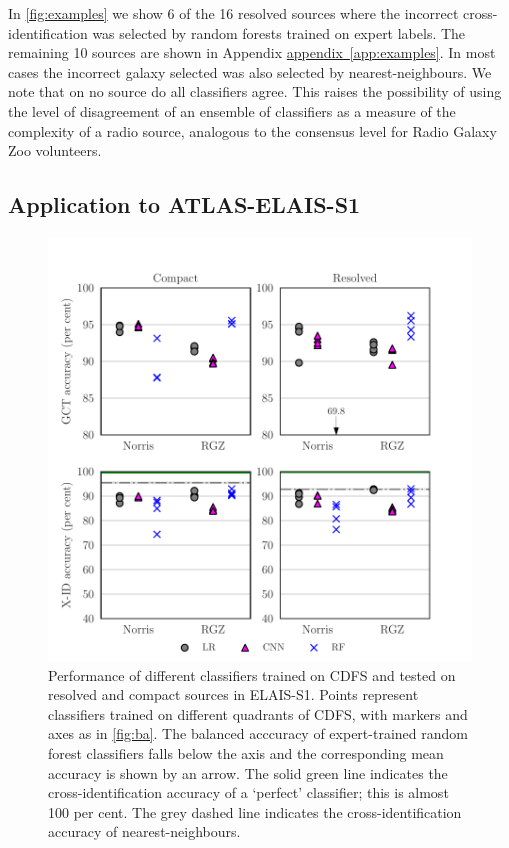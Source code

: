 \documentclass[fleqn,usenatbib,usedcolumn]{mnras}
\newcommand{\aref}[1]{\hyperref[#1]{appendix~\ref{#1}}}
\begin{document}
    In \autoref{fig:examples} we show 6 of the 16 resolved sources where the incorrect cross-identification was selected by random forests trained on expert labels. The remaining 10 sources are shown in Appendix \aref{app:examples}. In most cases the incorrect galaxy selected was also selected by nearest-neighbours. We note that on no source do all classifiers agree. This raises the possibility of using the level of disagreement of an ensemble of classifiers as a measure of the complexity of a radio source, analogous to the consensus level for Radio Galaxy Zoo volunteers.

\subsection{Application to ATLAS-ELAIS-S1}
  \label{sec:elais}

  \begin{figure}
  \centering
  \includegraphics[width=\columnwidth]{images/elais-grid-new.pdf}
  \caption{Performance of different classifiers trained on CDFS and tested on resolved and compact sources in ELAIS-S1. Points represent classifiers trained on different quadrants of CDFS, with markers and axes as in \autoref{fig:ba}. The balanced acccuracy of expert-trained random forest classifiers falls below the axis and the corresponding mean accuracy is shown by an arrow. The solid green line indicates the cross-identification accuracy of a `perfect' classifier; this is almost 100 per cent. The grey dashed line indicates the cross-identification accuracy of nearest-neighbours.
    \label{fig:elais-ba}}
  \end{figure}
\end{document}
